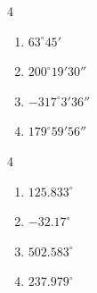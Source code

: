 \documentclass{ximera}
\begin{document}
	\author{Stitz-Zeager}


\begin{multicols}{4}

\begin{enumerate}

\item $63^{\circ} 45'$
\item $200^{\circ} 19' 30''$
\item $-317^{\circ} 3' 36''$
\item $179^{\circ} 59' 56''$

\setcounter{HW}{\value{enumi}}

\end{enumerate}

\end{multicols}

\begin{multicols}{4}

\begin{enumerate}

\setcounter{enumi}{\value{HW}}

\item $125.833^{\circ}$
\item $-32.17^{\circ}$
\item $502.583^{\circ}$
\item $237.979^{\circ}$

\setcounter{HW}{\value{enumi}}

\end{enumerate}

\end{multicols}
\end{document}
